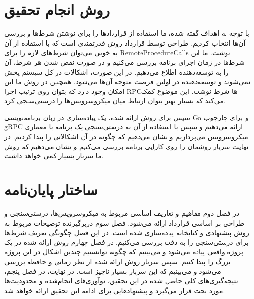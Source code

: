 \section{روش انجام تحقیق}
با توجه به اهداف گفته شده، ما استفاده از قراردادها را برای نوشتن شرط‌ها و بررسی آن‌ها انتخاب کردیم. طراحی توسط قرارداد روش قدرتمندی است که با استفاده از آن به خوبی می‌توان شرط‌های لازم را برای
\glspl{RemoteProcedureCall}
نوشت. ما این شرط‌ها در زمان اجرای برنامه بررسی می‌کنیم و در صورت نقض شدن هر شرط، آن را به توسعه‌دهنده اطلاع می‌دهیم. در این صورت، اشکالات در کل سیستم پخش نمی‌شوند و توسعه‌دهنده در اولین فرصت متوجه آن‌ها می‌شود. همچنین در روش ما این امکان وجود دارد که بتوان روی ترتیب اجرا
\gls{RPC}ها
شرط نوشت. این موضوع کمک می‌کند که بسیار بهتر بتوان ارتباط میان میکروسرویس‌ها را درستی‌سنجی کرد.

سپس برای روش ارائه شده، یک پیاده‌سازی در زبان برنامه‌نویسی
Go \cite{golang}
و برای چارچوب
gRPC \cite{grpc}
ارائه می‌دهیم و سپس با استفاده از آن به درستی‌سنجی یک برنامه با معماری میکروسرویس می‌پردازیم و نشان می‌دهیم که چگونه در آن اشکالاتی را پیدا کردیم. در نهایت سربار روشمان را روی کارایی برنامه بررسی می‌کنیم و نشان می‌دهیم که روش ما سربار بسیار کمی خواهد داشت.

\section{ساختار پایان‌نامه}
در فصل دوم مفاهیم و تعاریف اساسی مربوط به میکروسرویس‌ها، درستی‌سنجی و طراحی بر اساسی قرارداد ارائه می‌شود. فصل سوم دربرگیرنده توضیحات مربوط به روش پیشنهادی و کتابخانه پیاده‌سازی شده است. در این فصل چگونگی تعریف شرط‌ها برای درستی‌سنجی را به دقت بررسی می‌کنیم. در فصل چهارم روش ارائه شده در یک پروژه واقعی پیاده می‌شود و می‌بینیم که چگونه توانستیم چندین اشکال در این پروژه بزرگ را پیدا کنیم. سپس سربار روش ارائه شده از نظر زمانی و حافظه بررسی می‌شود و می‌بینیم که این سربار بسیار ناچیز است. در نهایت، در فصل پنجم، نتیجه‌گیری‌های کلی حاصل شده در این تحقیق، نوآوری‌های انجام‌شده و محدودیت‌ها مورد بحث قرار می‌گیرد و پیشنهادهایی برای ادامه این تحقیق ارائه خواهد شد.
